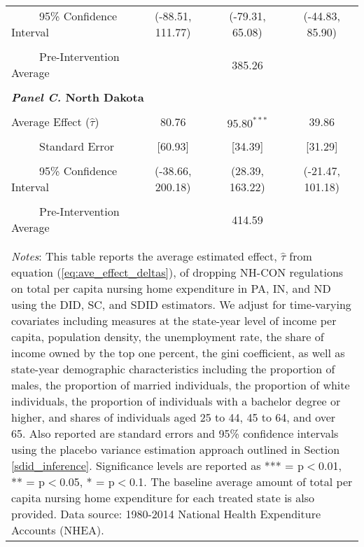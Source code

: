 \documentclass[12pt]{article}
\begin{document}
\begin{table}[htbp]
\begin{tabular}{l*{3}{c}}
\\[-2ex]
\multicolumn{1}{l}{\ \ \ \ \ 95\% Confidence Interval}&   \multicolumn{1}{c}{(-88.51, 111.77)}&   \multicolumn{1}{c}{(-79.31, 65.08)}&   \multicolumn{1}{c}{(-44.83, 85.90)}\\
\\[-2ex]
\multicolumn{1}{l}{\ \ \ \ \ Pre-Intervention Average}&   \multicolumn{3}{c}{385.26}\\
\\[-.1ex]
\multicolumn{4}{l}{\textbf{\textit{Panel C.} North Dakota}}\\
\\[-1.5ex]
\multicolumn{1}{l}{Average Effect ($\hat{\tau}$)}&   \multicolumn{1}{c}{80.76}&   \multicolumn{1}{c}{$95.80^{***}$}&  \multicolumn{1}{c}{39.86}\\
\\[-2ex]
\multicolumn{1}{l}{\ \ \ \ \ Standard Error}  &\multicolumn{1}{c}{[60.93]}&\multicolumn{1}{c}{[34.39]}&\multicolumn{1}{c}{[31.29]}\\
\\[-2ex]
\multicolumn{1}{l}{\ \ \ \ \ 95\% Confidence Interval}&   \multicolumn{1}{c}{(-38.66, 200.18)}&   \multicolumn{1}{c}{(28.39, 163.22)}&   \multicolumn{1}{c}{(-21.47, 101.18)}\\
\\[-2ex]
\multicolumn{1}{l}{\ \ \ \ \ Pre-Intervention Average}&   \multicolumn{3}{c}{414.59}\\
\\[-.1ex]
\hline\hline
\\[-2ex]
\multicolumn{4}{p{.78\linewidth}}{\footnotesize \textit{Notes}: This table reports the average estimated effect, $\hat{\tau}$ from equation (\ref{eq:ave_effect_deltas}), of dropping NH-CON regulations on total per capita nursing home expenditure in PA, IN, and ND using the DID, SC, and SDID estimators. We adjust for time-varying covariates including measures at the state-year level of income per capita, population density, the unemployment rate, the share of income owned by the top one percent, the gini coefficient, as well as state-year demographic characteristics including the proportion of males, the proportion of married individuals, the proportion of white individuals, the proportion of individuals with a bachelor degree or higher, and shares of individuals aged 25 to 44, 45 to 64, and over 65. Also reported are standard errors and 95\% confidence intervals using the placebo variance estimation approach outlined in Section \ref{sdid_inference}. Significance levels are reported as *** = p$<$0.01, ** = p$<$0.05, * = p$<$0.1. The baseline average amount of total per capita nursing home expenditure for each treated state is also provided. Data source: 1980-2014 National Health Expenditure Accounts (NHEA).}
\end{tabular}
\end{table}
\vfill
\end{document}

